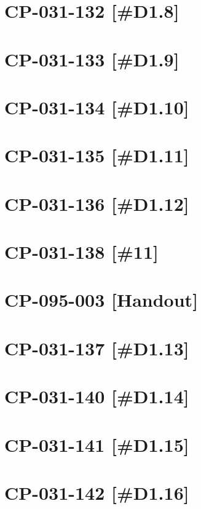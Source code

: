 \setcounter{section}{0}

\section{CP-031-132 [\#D1.8]}\newpage	
\section{CP-031-133 [\#D1.9]}\newpage	
\section{CP-031-134 [\#D1.10]}\newpage	
\section{CP-031-135 [\#D1.11]}\newpage	
\section{CP-031-136 [\#D1.12]}\newpage	
\section{CP-031-138 [\#11]}\newpage	
\section{CP-095-003 [Handout]}\newpage

\setcounter{section}{0}

\section{CP-031-137 [\#D1.13]}\newpage	
\section{CP-031-140 [\#D1.14]}\newpage	
\section{CP-031-141 [\#D1.15]}\newpage	
\section{CP-031-142 [\#D1.16]}\newpage	
